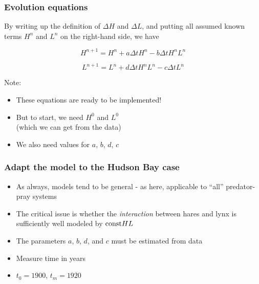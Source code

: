 \documentclass{beamer}
\begin{document}
\begin{frame}
\frametitle{Evolution equations}

\begin{block}{}
By writing up the definition of $\Delta H$ and $\Delta L$, and putting
all assumed known terms $H^n$ and $L^n$ on the right-hand side, we have

\[ H^{n+1} = H^n + a\Delta t H^n - b\Delta t H^n L^n \]

\[ L^{n+1} = L^n + d\Delta t H^nL^n - c\Delta t L^n \]

Note:

\begin{itemize}
 \item These equations are ready to be implemented!

 \item But to start, we need $H^0$ and $L^0$ \\
   (which we can get from the data)

 \item We also need values for $a$, $b$, $d$, $c$
\end{itemize}

\noindent
\end{block}
\end{frame}

\begin{frame}
\frametitle{Adapt the model to the Hudson Bay case}

\begin{block}{}
\begin{itemize}
 \item As always, models tend to be general - as here, applicable
   to ``all'' predator-pray systems

 \item The critical issue is whether the \emph{interaction} between hares and lynx
   is sufficiently well modeled by $\hbox{const}HL$

 \item The parameters $a$, $b$, $d$, and $c$ must be
   estimated from data

 \item Measure time in years

 \item $t_0=1900$, $t_m=1920$
\end{itemize}

\noindent
\end{block}
\end{frame}
\end{document}
